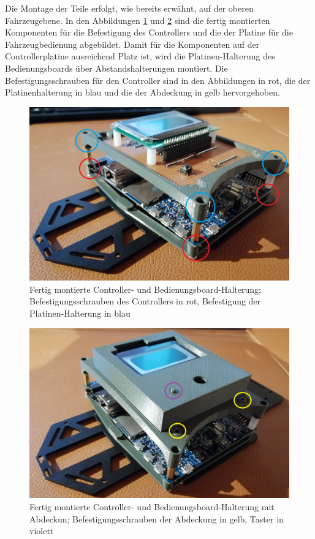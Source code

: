Die Montage der Teile erfolgt, wie bereits erwähnt, auf der oberen Fahrzeugebene. In den Abbildungen \ref{fig:ControllerMontage} und \ref{fig:AbdeckungMontage} sind die fertig montierten Komponenten für die Befestigung des Controllers und die der Platine für die Fahrzeugbedienung abgebildet. Damit für die Komponenten auf der Controllerplatine ausreichend Platz ist, wird die Platinen-Halterung des Bedienungsboards über Abstandshalterungen montiert. Die Befestigungsschrauben für den Controller sind in den Abbildungen in rot, die der Platinenhalterung in blau und die der Abdeckung in gelb hervorgehoben.

\begin{figure}[H] %
\includegraphics[width=.8\textwidth]{sec2/images/3DAnbaukomponenten/Montagebilder/ControllerMontage} 
\centering
\captionsetup{width=.95\textwidth}
\caption[Fertig montierte Controller- und Bedienungsboard-Halterung]{Fertig montierte Controller- und Bedienungsboard-Halterung; Befestigungsschrauben des Controllers in rot, Befestigung der Platinen-Halterung in blau}\centering
\label{fig:ControllerMontage}
\end{figure}

\begin{figure}[H] %
\includegraphics[width=.8\textwidth]{sec2/images/3DAnbaukomponenten/Montagebilder/AbdeckungMontage} 
\centering
\captionsetup{width=.95\textwidth}
\caption[Fertig montierte Controller- und Bedienungsboard-Halterung mit Abdeckung]{Fertig montierte Controller- und Bedienungsboard-Halterung mit Abdeckun; Befestigungsschrauben der Abdeckung in gelb, Taster in violett}\centering
\label{fig:AbdeckungMontage}
\end{figure}

